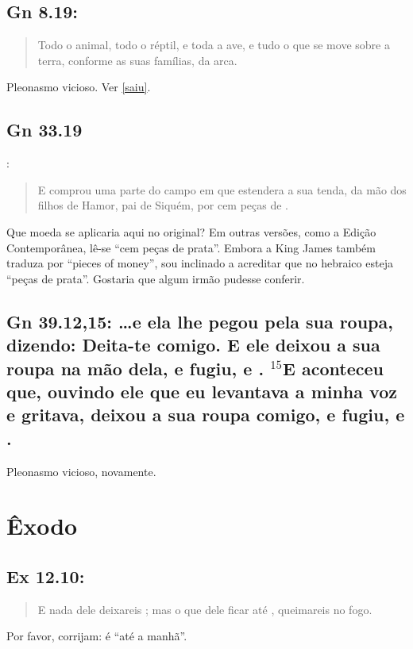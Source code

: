 \subsection{Gn 8.19:}
\begin{quote}
    \small
Todo o animal, todo o réptil, e toda a ave, e tudo o que se move sobre a terra, conforme as suas famílias,  da arca.
\end{quote}

Pleonasmo vicioso. Ver \ref{saiu}.

\subsection{Gn 33.19}:
\begin{quote}
    \small
E comprou uma parte do campo em que estendera a sua tenda, da mão dos filhos de Hamor, pai de Siquém, por cem peças de .
\end{quote}

Que moeda se aplicaria aqui no original? Em outras versões, como a Edição Contemporânea, lê-se ``cem peças de prata''. Embora a King James também traduza por ``pieces of money'', sou inclinado a acreditar que no hebraico esteja ``peças de prata''. Gostaria que algum irmão pudesse conferir.

\subsection{Gn 39.12,15: \ldots e ela lhe pegou pela sua roupa, dizendo: Deita-te comigo. E ele deixou a sua roupa na mão dela, e fugiu, e . $^{\mathrm{15}}$E aconteceu que, ouvindo ele que eu levantava a minha voz e gritava, deixou a sua roupa comigo, e fugiu, e .}

Pleonasmo vicioso, novamente.

\section{Êxodo}
\subsection{Ex 12.10:}
\begin{quote}
    \small
E nada dele deixareis ; mas o que dele ficar até , queimareis no fogo.
\end{quote}

Por favor, corrijam: é ``até a manhã''.

